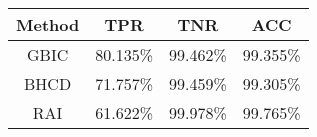 \begin{tabular}{cccc}
\hline
  Method  &   TPR    &   TNR    &   ACC    \\
\hline
   GBIC   & 80.135\% & 99.462\% & 99.355\% \\
   BHCD   & 71.757\% & 99.459\% & 99.305\% \\
   RAI    & 61.622\% & 99.978\% & 99.765\% \\
\hline
\end{tabular}